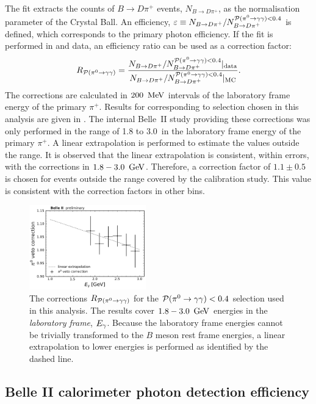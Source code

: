 The fit extracts the counts of $B\to D\pi^+$ events, $N_{B\to D\pi^+}$, as the normalisation parameter of the Crystal Ball.
An efficiency, $\varepsilon\equiv N_{B\rightarrow D\pi^+}/N^{{\mathcal{P}(\pi^0\rightarrow\gamma\gamma)}<0.4}_{B\rightarrow D\pi^+}$ is defined, which corresponds to the primary photon efficiency.
If the fit is performed in \MC and data, an efficiency ratio can be used as a correction factor:
\begin{equation}\label{eq:piveto_correction}
    R_{{\mathcal{P}(\pi^0\rightarrow\gamma\gamma)}} = \frac{N_{B\rightarrow D\pi^+}/N^{{\mathcal{P}(\pi^0\rightarrow\gamma\gamma)}<0.4}_{B\rightarrow D\pi^+}|_{\mathrm{data}}}{N_{B\rightarrow D\pi^+}/N^{{\mathcal{P}(\pi^0\rightarrow\gamma\gamma)}<0.4}_{B\rightarrow D\pi^+}|_{\mathrm{MC}}}.
\end{equation}
The corrections are calculated in $200~\mathrm{\,Me\kern -0.1em V}$ intervals of the laboratory frame energy of the primary $\pi^+$.
Results for corresponding to selection chosen in this analysis are given in .
The internal Belle~II study providing these corrections was only performed in the range of 1.8 to 3.0~\gev in the laboratory frame energy of the primary $\pi^+$.
A linear extrapolation is performed to estimate the values outside the range.
It is observed that the linear extrapolation is consistent, within errors, with the corrections in $1.8-3.0~\mathrm{\,Ge\kern -0.1em V}$.
Therefore, a correction factor of $1.1\pm0.5$ is chosen for events outside the range covered by the calibration study.
This value is consistent with the correction factors in other \Egamma bins.
\begin{figure}[htbp!]
    \centering
    \includegraphics[width=0.45\textwidth]{figures/data_sim_corrections/pi0veto_corrections.pdf}
    \caption{\label{fig:piveto_corrections} The corrections $R_{{\mathcal{P}(\pi^0\rightarrow\gamma\gamma)}}$ for the ${\mathcal{P}(\pi^0\rightarrow\gamma\gamma)}<0.4$ selection used in this analysis.
    The results cover $1.8-3.0~\mathrm{\,Ge\kern -0.1em V}$ energies in the \textit{laboratory frame}, ${E_{\gamma}}$.
    Because the laboratory frame energies cannot be trivially transformed to the $B$ meson rest frame energies, a linear extrapolation to lower energies is performed as identified by the dashed line.
    }
\end{figure}

\subsection{Belle II calorimeter photon detection efficiency}\label{sec:photon_efficiency}

